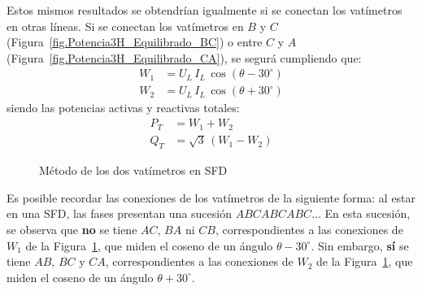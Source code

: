 Estos mismos resultados se obtendrían igualmente si se conectan los vatímetros en otras líneas. Si se conectan los vatímetros en $B$ y $C$ (Figura~\ref{fig.Potencia3H_Equilibrado_BC}) o entre $C$ y $A$ (Figura~\ref{fig.Potencia3H_Equilibrado_CA}), se segurá cumpliendo que: 
\begin{align*}
    W_1&=U_L\,I_L\,\cos(\theta-30^\circ) \\
    W_2&=U_L\,I_L\,\cos(\theta+30^\circ)
\end{align*}
siendo las potencias activas y reactivas totales: 
\begin{align*}
    P_T&=W_1 + W_2\\
    Q_T&=\sqrt{3}\,(W_1 - W_2)
\end{align*}
\begin{figure}[H]
    \centering{}\hfill
    \hfill
    \caption{Método de los dos vatímetros en SFD}
    \label{fig.potencia3H_equilibrado_SFD}
\end{figure}

\begin{remark}
    Es posible recordar las conexiones de los vatímetros de la siguiente forma: al estar en una SFD, las fases presentan una sucesión $ABCABCABC$... En esta sucesión, se observa que {\color{red}\textbf{no}} se tiene $AC$, $BA$ ni $CB$, correspondientes a las conexiones de $W_1$ de la Figura~\ref{fig.potencia3H_equilibrado_SFD}, que miden el coseno de un ángulo $\theta-30^\circ$. Sin embargo, {\color{red}\textbf{sí}} se tiene $AB$, $BC$ y $CA$, correspondientes a las conexiones de $W_2$ de la Figura~\ref{fig.potencia3H_equilibrado_SFD}, que miden el coseno de un ángulo $\theta+30^\circ$.
\end{remark}
  
